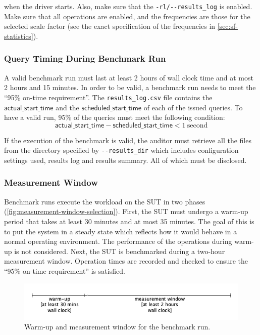 \begin{description}
        when the driver starts. Also, make sure that the \verb|-rl/--results_log| is enabled. Make sure that all operations are enabled, and the frequencies are those for the selected scale factor (see the exact specification of the frequencies in \autoref{sec:sf-statistics}).
\end{description}

\subsubsection{Query Timing During Benchmark Run}
\label{sec:ontime-requirements}
A valid benchmark run must last at least 2 hours of wall clock time and at most 2 hours and 15 minutes.
In order to be valid, a benchmark run needs to meet the ``95\% on-time requirement''.
The \texttt{results\_log.csv} file contains the $\mathsf{actual\_start\_time}$ and the $\mathsf{scheduled\_start\_time}$ of each of the issued queries. To have a valid run, 95\% of the queries must meet the following condition:
\begin{equation*}
    \mathsf{actual\_start\_time} - \mathsf{scheduled\_start\_time} < 1\
    \mathrm{second}
\end{equation*}

If the execution of the benchmark is valid, the auditor must retrieve all the files from the directory specified by \verb|--results_dir| which includes configuration settings used, results log and results summary. All of which must be disclosed.

\subsubsection{Measurement Window}
\label{sec:transaction-workload-measurement-window}

Benchmark runs execute the workload on the SUT in two phases (\autoref{fig:measurement-window-selection}).
First, the SUT must undergo a warm-up period that takes at least 30 minutes and at most 35 minutes. The goal of this is to put the system in a steady state which reflects how it would behave in a normal operating environment. The performance of the operations during warm-up is not considered.
Next, the SUT is benchmarked during a two-hour measurement window. Operation times are recorded and checked to ensure the ``95\% on-time requirement'' is satisfied.

\begin{figure}[h]
    \centering
    \includegraphics[width=.7\linewidth]{figures/measurement-window-selection}
    \caption{Warm-up and measurement window for the benchmark run.}
    \label{fig:measurement-window-selection}
\end{figure}

